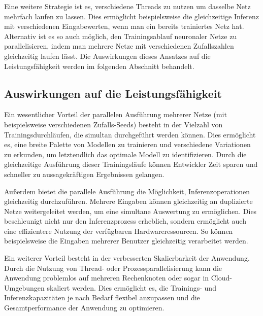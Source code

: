 Eine weitere Strategie ist es, verschiedene Threads zu nutzen um dasselbe Netz mehrfach laufen zu lassen. Dies ermöglicht beispielsweise die gleichzeitige Inferenz mit verschiedenen Eingabewerten, wenn man ein bereits trainiertes Netz hat. Alternativ ist es so auch möglich, den Trainingsablauf neuronaler Netze zu parallelisieren, indem man mehrere Netze mit verschiedenen Zufallszahlen gleichzeitig laufen lässt. Die Auswirkungen dieses Ansatzes auf die Leistungsfähigkeit werden im folgenden Abschnitt behandelt.

\subsection{Auswirkungen auf die Leistungsfähigkeit}
\label{sec:Grundlagen_Parallelisierung_Leistungsfähigkeit}

Ein wesentlicher Vorteil der parallelen Ausführung mehrerer Netze (mit beispielsweise verschiedenen Zufalls-Seeds) besteht in der Vielzahl von Trainingsdurchläufen, die simultan durchgeführt werden können. Dies ermöglicht es, eine breite Palette von Modellen zu trainieren und verschiedene Variationen zu erkunden, um letztendlich das optimale Modell zu identifizieren. Durch die gleichzeitige Ausführung dieser Trainingsläufe können Entwickler Zeit sparen und schneller zu aussagekräftigen Ergebnissen gelangen.

Außerdem bietet die parallele Ausführung die Möglichkeit, Inferenzoperationen gleichzeitig durchzuführen. Mehrere Eingaben können gleichzeitig an duplizierte Netze weitergeleitet werden, um eine simultane Auswertung zu ermöglichen. Dies beschleunigt nicht nur den Inferenzprozess erheblich, sondern ermöglicht auch eine effizientere Nutzung der verfügbaren Hardwareressourcen. So können beispielsweise die Eingaben mehrerer Benutzer gleichzeitig verarbeitet werden.

Ein weiterer Vorteil besteht in der verbesserten Skalierbarkeit der Anwendung. Durch die Nutzung von Thread- oder Prozessparallelisierung kann die Anwendung problemlos auf mehreren Rechenknoten oder sogar in Cloud-Umgebungen skaliert werden. Dies ermöglicht es, die Trainings- und Inferenzkapazitäten je nach Bedarf flexibel anzupassen und die Gesamtperformance der Anwendung zu optimieren.
